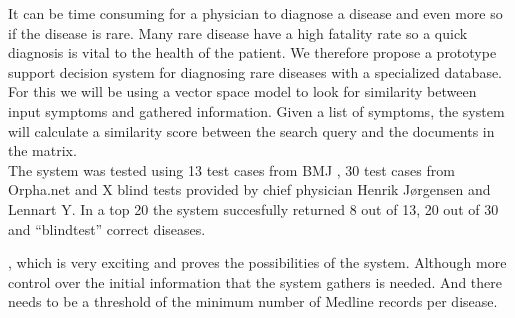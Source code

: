 
It can be time consuming for a physician to diagnose a disease and
even more so if the disease is rare. Many rare disease have a high
fatality rate so a quick diagnosis is vital to the health of the
patient. We therefore propose a prototype support decision system for
diagnosing rare diseases with a specialized database. For this we will
be using a vector space model to look for similarity between input
symptoms and gathered information. Given a list of symptoms, the
system will calculate a similarity score between the search query and
the documents in the matrix. \\

The system was tested using 13 test cases from
BMJ \cite{HangwiTang11102006}, 30 test cases from Orpha.net and X 
blind tests provided by chief physician Henrik J\o rgensen and Lennart Y. 
In a top 20 the system succesfully returned 8 out of 13, 20 out of 30 
and ``blindtest'' correct diseases.

, which is very exciting and proves the
possibilities of the system. Although more control over the initial
information that the system gathers is needed. And there needs to be a
threshold of the minimum number of Medline records per disease.\\
